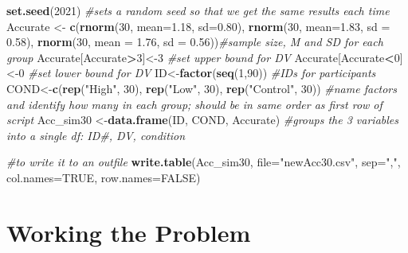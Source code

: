 \documentclass[
  english,
]{book}
\newenvironment{Shaded}{\begin{snugshade}}{\end{snugshade}}
\newcommand{\CommentTok}[1]{\textcolor[rgb]{0.56,0.35,0.01}{\textit{#1}}}
\newcommand{\DataTypeTok}[1]{\textcolor[rgb]{0.13,0.29,0.53}{#1}}
\newcommand{\DecValTok}[1]{\textcolor[rgb]{0.00,0.00,0.81}{#1}}
\newcommand{\FloatTok}[1]{\textcolor[rgb]{0.00,0.00,0.81}{#1}}
\newcommand{\KeywordTok}[1]{\textcolor[rgb]{0.13,0.29,0.53}{\textbf{#1}}}
\newcommand{\NormalTok}[1]{#1}
\newcommand{\OperatorTok}[1]{\textcolor[rgb]{0.81,0.36,0.00}{\textbf{#1}}}
\newcommand{\OtherTok}[1]{\textcolor[rgb]{0.56,0.35,0.01}{#1}}
\newcommand{\StringTok}[1]{\textcolor[rgb]{0.31,0.60,0.02}{#1}}
\begin{document}
\begin{Shaded}
\begin{Highlighting}[]
\KeywordTok{set.seed}\NormalTok{(}\DecValTok{2021}\NormalTok{) }\CommentTok{#sets a random seed so that we get the same results each time}
\NormalTok{Accurate <-}\StringTok{ }\KeywordTok{c}\NormalTok{(}\KeywordTok{rnorm}\NormalTok{(}\DecValTok{30}\NormalTok{, }\DataTypeTok{mean=}\FloatTok{1.18}\NormalTok{, }\DataTypeTok{sd=}\FloatTok{0.80}\NormalTok{), }\KeywordTok{rnorm}\NormalTok{(}\DecValTok{30}\NormalTok{, }\DataTypeTok{mean=}\FloatTok{1.83}\NormalTok{, }\DataTypeTok{sd =} \FloatTok{0.58}\NormalTok{), }\KeywordTok{rnorm}\NormalTok{(}\DecValTok{30}\NormalTok{, }\DataTypeTok{mean =} \FloatTok{1.76}\NormalTok{, }\DataTypeTok{sd =} \FloatTok{0.56}\NormalTok{))}\CommentTok{#sample size, M and SD for each group}
\NormalTok{Accurate[Accurate}\OperatorTok{>}\DecValTok{3}\NormalTok{]<-}\DecValTok{3} \CommentTok{#set upper bound for DV}
\NormalTok{Accurate[Accurate}\OperatorTok{<}\DecValTok{0}\NormalTok{]<-}\DecValTok{0} \CommentTok{#set lower bound for DV}
\NormalTok{ID<-}\KeywordTok{factor}\NormalTok{(}\KeywordTok{seq}\NormalTok{(}\DecValTok{1}\NormalTok{,}\DecValTok{90}\NormalTok{)) }\CommentTok{#IDs for participants}
\NormalTok{COND<-}\KeywordTok{c}\NormalTok{(}\KeywordTok{rep}\NormalTok{(}\StringTok{"High"}\NormalTok{, }\DecValTok{30}\NormalTok{), }\KeywordTok{rep}\NormalTok{(}\StringTok{"Low"}\NormalTok{, }\DecValTok{30}\NormalTok{), }\KeywordTok{rep}\NormalTok{(}\StringTok{"Control"}\NormalTok{, }\DecValTok{30}\NormalTok{)) }\CommentTok{#name factors and identify how many in each group; should be in same order as first row of script}
\NormalTok{Acc_sim30 <-}\KeywordTok{data.frame}\NormalTok{(ID, COND, Accurate) }\CommentTok{#groups the 3 variables into a single df:  ID#, DV, condition}

\CommentTok{#to write it to an outfile}
\KeywordTok{write.table}\NormalTok{(Acc_sim30, }\DataTypeTok{file=}\StringTok{"newAcc30.csv"}\NormalTok{, }\DataTypeTok{sep=}\StringTok{","}\NormalTok{, }\DataTypeTok{col.names=}\OtherTok{TRUE}\NormalTok{, }\DataTypeTok{row.names=}\OtherTok{FALSE}\NormalTok{)}
\end{Highlighting}
\end{Shaded}

\hypertarget{working-the-problem}{%
\section{Working the Problem}\label{working-the-problem}}
\end{document}
